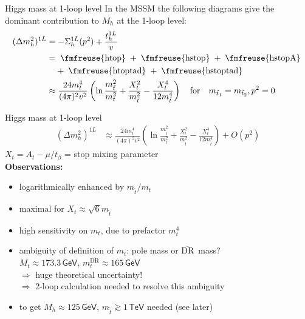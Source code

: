 \documentclass[hyperref={pdfpagelabels=false},ngerman]{beamer}
\newcommand{\fmfvcenter}[1]{\;\vcenter{\hbox{\fmfreuse{#1}}}\;}
\newcommand{\eh}[1]{\,\mathsf{#1}}
\renewcommand{\emph}{\textbf}
\newcommand{\DRbar}{\ensuremath{\overline{\text{DR}}}}
\begin{document}
\begin{frame}{Higgs mass at 1-loop level}
  In the MSSM the following diagrams give the dominant contribution to
  $M_h$ at the 1-loop level:
  \begin{align*}
    (\Delta m_h^2)^{1L} &= -\Sigma_h^{1L}(p^2) + \frac{t_h^{1L}}{v} \\
    &= \fmfvcenter{htop} + \fmfvcenter{hstop} + \fmfvcenter{hstopA} \\
    &\phantom{={}} + \fmfvcenter{htoptad} + \fmfvcenter{hstoptad} \\
    &\approx \frac{24 m_t^4}{(4\pi)^2 v^2} \left(
      \ln\frac{m_{\tilde{t}}^2}{m_t^2}
      + \frac{X_t^2}{m_{\tilde{t}}^2}
      - \frac{X_t^4}{12 m_{\tilde{t}}^4}
    \right)
    \quad \text{for} \quad m_{\tilde{t}_1} = m_{\tilde{t}_2}, p^2 = 0
  \end{align*}
\end{frame}

\begin{frame}{Higgs mass at 1-loop level}
  \begin{align*}
    (\Delta m_h^2)^{1L} &\approx
    \frac{24 m_t^4}{(4\pi)^2 v^2} \left(
      \ln\frac{m_{\tilde{t}}^2}{m_t^2}
      + \frac{X_t^2}{m_{\tilde{t}}^2}
      - \frac{X_t^4}{12 m_{\tilde{t}}^4}
    \right) + O(p^2)
  \end{align*}
  $X_t = A_t - \mu/t_\beta$ = stop mixing parameter
  \\[1em]
  \emph{Observations:}
  \begin{itemize}
  \item logarithmically enhanced by $m_{\tilde{t}} / m_t$
  \item maximal for $X_t \approx \sqrt{6} m_{\tilde{t}}$
  \item high sensitivity on $m_t$, due to prefactor $m_t^4$
  \item ambiguity of definition of $m_t$: pole mass or \DRbar\ mass? \\
    $M_t \approx 173.3\eh{GeV}$, $m_t^{\DRbar} \approx 165\eh{GeV}$ \\
    $\Rightarrow$ huge theoretical uncertainty!\\
    $\Rightarrow$ 2-loop calculation needed to resolve this ambiguity
  \item to get $M_h \approx 125\eh{GeV}$, $m_{\tilde{t}} \gtrsim 1\eh{TeV}$ needed
    (see later)
  \end{itemize}
\end{frame}
\end{document}
